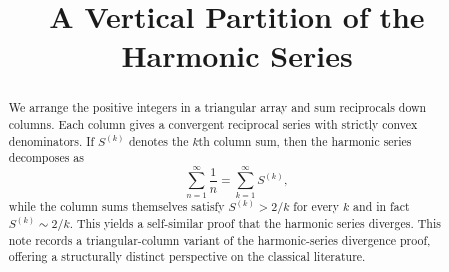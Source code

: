\documentclass{article}
\theoremstyle{theorem}
\theoremstyle{definition}
\begin{document}





\title{A Vertical Partition of the Harmonic Series}


\maketitle

\begin{abstract}
We arrange the positive integers in a triangular array and sum reciprocals down columns. Each column gives a convergent reciprocal series with strictly convex denominators. If $S^{(k)}$ denotes the $k$th column sum, then the harmonic series decomposes as
\[
\sum_{n=1}^{\infty} \frac{1}{n} = \sum_{k=1}^{\infty} S^{(k)},
\]
while the column sums themselves satisfy $S^{(k)} > 2/k$ for every $k$ and in fact $S^{(k)} \sim 2/k$. This yields a self-similar proof that the harmonic series diverges. This note records a triangular-column variant of the harmonic-series divergence proof, offering a structurally distinct perspective on the classical literature.
\end{abstract}

\vspace{10px}
\vspace{10px}
\end{document}

